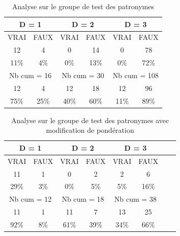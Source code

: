 \renewcommand{\arraystretch} {1.25}
\begin{table}[ht]
    \centering
    \begin{tabular}{|c|c|c|c|c|c|}
        \hline \multicolumn{2}{|c}{D = 1}& \multicolumn{2}{|c}{D = 2} & \multicolumn{2}{|c|}{D = 3 } \\
        \hline VRAI & FAUX & VRAI & FAUX & VRAI & FAUX \\
        \hline \hline  12 & 4 & 0 & 14 & 0 & 78 \\
        \hline 11\% & 4\% & 0\% & 13\% & 0\% & 72\% \\
        \hline \hline \multicolumn{2}{|c}{Nb cum = 16}& \multicolumn{2}{|c|}{Nb cum = 30} & \multicolumn{2}{c|}{Nb cum = 108} \\
        \hline \hline  12 & 4 & 12 & 18 & 12 & 96 \\
        \hline 75\% & 25\% & 40\% & 60\% & 11\% & 89\% \\
        \hline 
    \end{tabular}
    \caption{Analyse sur le groupe de test des patronymes }
    \label{groupe_patro}
\end{table}

\renewcommand{\arraystretch} {1.25}
\begin{table}[ht]
    \centering
    \begin{tabular}{|c|c|c|c|c|c|c|c|}
        \hline \multicolumn{2}{|c}{D = 1}& \multicolumn{2}{|c}{D = 2} & \multicolumn{2}{|c|}{D = 3} \\
        \hline VRAI & FAUX & VRAI & FAUX & VRAI & FAUX \\
        \hline \hline  11 & 1 & 0 & 2 & 2 & 6 \\
        \hline 29\% & 3\% & 0\% & 5\% & 5\% & 16\% \\
        \hline \hline \multicolumn{2}{|c}{Nb cum = 12}& \multicolumn{2}{|c|}{Nb cum = 18} & \multicolumn{2}{c|}{Nb cum = 38} \\
        \hline \hline  11 & 1 & 11 & 7 & 13 & 25 \\
        \hline 92\% & 8\% & 61\% & 39\% & 34\% & 66\% \\
        \hline 
    \end{tabular}
    \caption{Analyse sur le groupe de test des patronymes avec modification de pondération}
    \label{groupe_patro_md}
\end{table}

